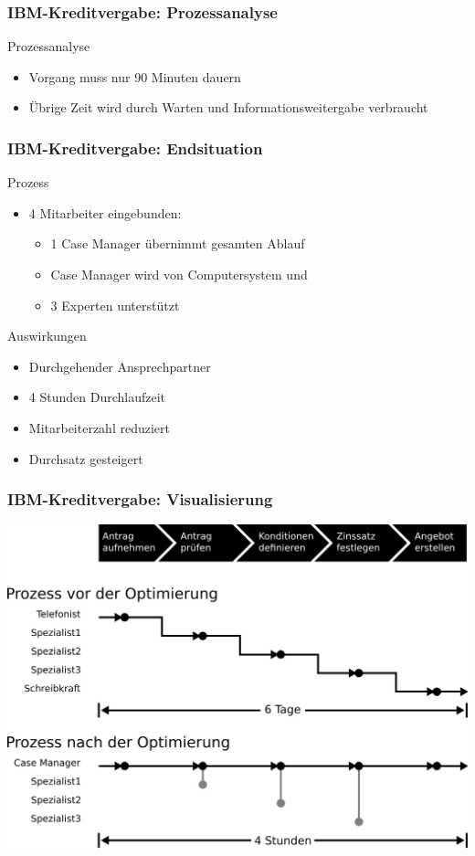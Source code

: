 \documentclass[xcolor=dvipsnames]{beamer}
\begin{document}
 \begin{frame}
  \frametitle{IBM-Kreditvergabe: Prozessanalyse}
  Prozessanalyse
  \begin{itemize}
    \item Vorgang muss nur 90 Minuten dauern
    \item Übrige Zeit wird durch Warten und Informationsweitergabe verbraucht
  \end{itemize}
 \end{frame}

 \begin{frame}
  \frametitle{IBM-Kreditvergabe: Endsituation}
  Prozess
  \begin{itemize}
    \item 4 Mitarbeiter eingebunden:
    \begin{itemize}
      \item 1 Case Manager übernimmt gesamten Ablauf
      \item Case Manager wird von Computersystem und
      \item 3 Experten unterstützt
    \end{itemize}
  \end{itemize}

  Auswirkungen
  \begin{itemize}
    \item Durchgehender Ansprechpartner
    \item 4 Stunden Durchlaufzeit
    \item Mitarbeiterzahl reduziert
    \item Durchsatz gesteigert
  \end{itemize}
 \end{frame}

 \begin{frame}
  \frametitle{IBM-Kreditvergabe: Visualisierung}
  \includegraphics[scale=2.5]{4_5.png}
 \end{frame}
\end{document}
